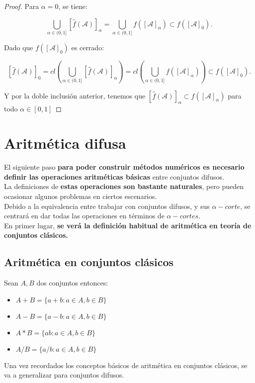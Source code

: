 \begin{proof}
	Para $\alpha=0$, se tiene:
	
	$$
	\bigcup_{\alpha \in (0, 1]} [\hat{f}(\mathcal{A})]_\alpha = \bigcup_{\alpha \in (0, 1]} f([\mathcal{A}]_\alpha) \subset f([\mathcal{A}]_0).
	$$
	
	Dado que $f([\mathcal{A}]_0)$ es cerrado:
	
	$$
	[\hat{f}(\mathcal{A})]_0 = cl\left( \bigcup_{\alpha \in (0, 1]} [\hat{f}(\mathcal{A})]_\alpha  \right) = cl\left(\bigcup_{\alpha \in (0, 1]} f([\mathcal{A}]_\alpha) \right)	\subset f([\mathcal{A}]_0).
	$$
	
	Y por la doble inclusión anterior, tenemos que $[\hat{f}(\mathcal{A})]_\alpha \subset f([\mathcal{A}]_\alpha)$ para todo $\alpha \in [0, 1]$
\end{proof}


\section{Aritmética difusa}
El siguiente paso \textbf{para poder construir métodos numéricos es necesario definir las operaciones aritméticas básicas} entre conjuntos difusos.\\
La definiciones de \textbf{estas operaciones son bastante naturales}, pero pueden ocasionar algunos problemas en ciertos escenarios.\\
Debido a la equivalencia entre trabajar con conjuntos difusos, y sus $\alpha-corte$, se centrará en dar todas las operaciones en términos de $\alpha-cortes$.\\
En primer lugar, \textbf{se verá la definición habitual de aritmética en teoría de conjuntos clásicos.}

\subsection{Aritmética en conjuntos clásicos}
Sean $A, B$ dos conjuntos entonces:
\begin{itemize}
	\item $A+B=\{a+b : a \in A, b\in B\}$
	\item $A - B =\{a - b : a \in A, b\in B\}$
	\item $A * B =\{ab : a \in A, b\in B\}$
	\item $A / B =\{a/b : a \in A, b\in B\}$
\end{itemize}

Una vez recordados los conceptos básicos de aritmética en conjuntos clásicos, se va a generalizar para conjuntos difusos.

